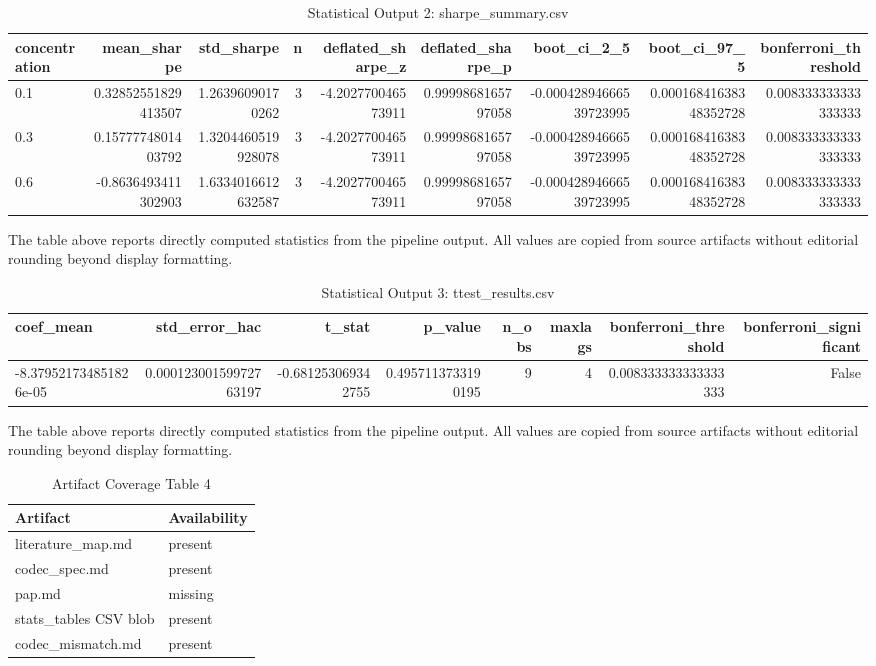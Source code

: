\documentclass[11pt]{article}
\begin{document}
\begin{table}[htbp]
\centering
\caption{Statistical Output 2: sharpe\_summary.csv}
\label{tab:sharpe-summary-csv}
\begin{tabular}{lrrrrrrrr}
\hline
concentration & mean\_sharpe & std\_sharpe & n & deflated\_sharpe\_z & deflated\_sharpe\_p & boot\_ci\_2\_5 & boot\_ci\_97\_5 & bonferroni\_threshold \\
\hline
0.1 & 0.32852551829413507 & 1.26396090170262 & 3 & -4.202770046573911 & 0.9999868165797058 & -0.00042894666539723995 & 0.00016841638348352728 & 0.008333333333333333 \\
0.3 & 0.1577774801403792 & 1.3204460519928078 & 3 & -4.202770046573911 & 0.9999868165797058 & -0.00042894666539723995 & 0.00016841638348352728 & 0.008333333333333333 \\
0.6 & -0.8636493411302903 & 1.6334016612632587 & 3 & -4.202770046573911 & 0.9999868165797058 & -0.00042894666539723995 & 0.00016841638348352728 & 0.008333333333333333 \\
\hline
\end{tabular}
\end{table}
The table above reports directly computed statistics from the pipeline output. All values are copied from source artifacts without editorial rounding beyond display formatting.

\begin{table}[htbp]
\centering
\caption{Statistical Output 3: ttest\_results.csv}
\label{tab:ttest-results-csv}
\begin{tabular}{lrrrrrrr}
\hline
coef\_mean & std\_error\_hac & t\_stat & p\_value & n\_obs & maxlags & bonferroni\_threshold & bonferroni\_significant \\
\hline
-8.379521734851826e-05 & 0.00012300159972763197 & -0.681253069342755 & 0.4957113733190195 & 9 & 4 & 0.008333333333333333 & False \\
\hline
\end{tabular}
\end{table}
The table above reports directly computed statistics from the pipeline output. All values are copied from source artifacts without editorial rounding beyond display formatting.

\begin{table}[htbp]
\centering
\caption{Artifact Coverage Table 4}
\label{tab:artifact-coverage-4}
\begin{tabular}{ll}
\hline
Artifact & Availability \\
\hline
literature\_map.md & present \\
codec\_spec.md & present \\
pap.md & missing \\
stats\_tables CSV blob & present \\
codec\_mismatch.md & present \\
\hline
\end{tabular}
\end{table}
\end{document}
